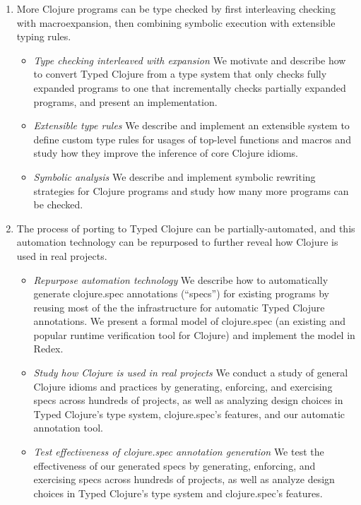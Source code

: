 \begin{enumerate}
  \item More Clojure programs can be type checked by first interleaving
    checking with macroexpansion, then combining
    symbolic execution with extensible typing rules.
    \begin{itemize}
      \item \emph{Type checking interleaved with expansion}
        We motivate and describe how to convert Typed Clojure from a type system that only checks fully
        expanded programs to one that incrementally
        checks partially expanded programs, and present an implementation.
      \item \emph{Extensible type rules}
        We describe and implement an extensible system to define custom type rules
        for usages of top-level functions and macros
        and study how they improve the inference of core Clojure idioms.
      \item \emph{Symbolic analysis}
        We describe and implement symbolic rewriting strategies for Clojure
        programs and study how many more programs can be checked.
    \end{itemize}
  \item The process of porting to Typed Clojure can be partially-automated, and this automation technology can be repurposed to further reveal how Clojure is used in real projects.
    \begin{itemize}
      \item \emph{Repurpose automation technology}
        We describe how to automatically generate clojure.spec annotations (``specs'') for existing programs by reusing
        most of the the infrastructure for automatic Typed Clojure annotations.
        We present a formal model of clojure.spec (an existing and popular runtime verification tool for Clojure)
        and implement the model in Redex.
      \item \emph{Study how Clojure is used in real projects}
        We conduct a study of general Clojure idioms and practices by generating, enforcing, and exercising specs
        across hundreds of projects, as well as analyzing design choices in Typed Clojure's type system,
        clojure.spec's features, and our automatic annotation tool.
      \item \emph{Test effectiveness of clojure.spec annotation generation}
        We test the effectiveness of our generated specs by generating, enforcing, and exercising specs
        across hundreds of projects, as well as analyze design choices in Typed Clojure's type system and
        clojure.spec's features.
    \end{itemize}
\end{enumerate}

